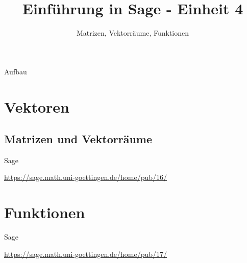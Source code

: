 \documentclass[hyperref={xetex}]{beamer}
\title{Einführung in Sage - Einheit 4}
\subtitle{Matrizen, Vektorräume, Funktionen}
\begin{document}
\titlepage

\begin{frame}{Aufbau}
\tableofcontents
\end{frame}


\section{Vektoren}
\subsection{Matrizen und Vektorräume}

\begin{frame}{Sage}
\begin{center}
\url{https://sage.math.uni-goettingen.de/home/pub/16/}
\end{center}
\end{frame}

\section{Funktionen}

\begin{frame}{Sage}
\begin{center}
\url{https://sage.math.uni-goettingen.de/home/pub/17/}
\end{center}
\end{frame}
\end{document}

